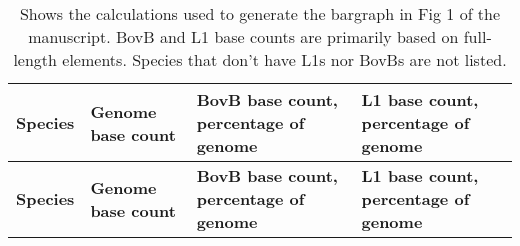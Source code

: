 
\vspace{-5mm}
{\footnotesize
\begin{longtable}{| L{4cm} | L{2.7cm}  | L{3.7cm} | L{3.7cm} |} 
\caption{\footnotesize
	Shows the calculations used to generate the bargraph in Fig 1 of the manuscript. 
	BovB and L1 base counts are primarily based on full-length elements.
	Species that don't have L1s nor BovBs are not listed. \label{table:genomecoverage}} \\

\hline \textbf{Species} & \textbf{Genome base count} & \textbf{BovB base count, percentage of genome} & \textbf{L1 base count, percentage of genome} \\ \hline 
\endfirsthead %

\hline \textbf{Species} & \textbf{Genome base count} & \textbf{BovB base count, percentage of genome} & \textbf{L1 base count, percentage of genome} \\ \hline
\endhead %


\end{longtable}}
